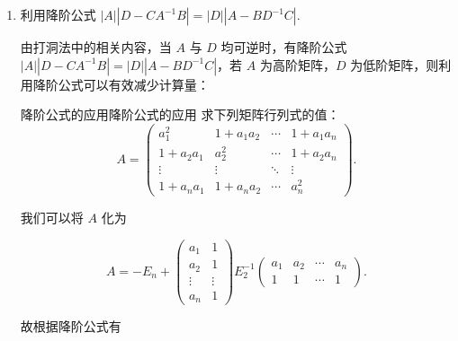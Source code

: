 \begin{enumerate}
    \item 利用降阶公式 $|A||D - CA^{-1}B| = |D||A - BD^{-1}C|$.

        由打洞法中的相关内容，当 $A$ 与 $D$ 均可逆时，有降阶公式 $|A||D - CA^{-1}B| = |D||A - BD^{-1}C|$，若 $A$ 为高阶矩阵，$D$ 为低阶矩阵，则利用降阶公式可以有效减少计算量：

        \begin{example}{降阶公式的应用}{降阶公式的应用}
            求下列矩阵行列式的值：
            \[A=\begin{pmatrix}
                    a_1^2    & 1+a_1a_2   & \cdots & 1+a_1a_n \\
                    1+a_2a_1 & a_2^2    & \cdots & 1+a_2a_n \\
                    \vdots   & \vdots   & \ddots & \vdots   \\
                    1+a_na_1 & 1+a_na_2 & \cdots & a_n^2
                \end{pmatrix}.\]
        \end{example}

        \begin{solution}
            我们可以将 $A$ 化为

            \[ A = -E_n + \begin{pmatrix}
                    a_1 & 1 \\ a_2 & 1 \\ \vdots & \vdots \\ a_n & 1
                \end{pmatrix} E_2^{-1} \begin{pmatrix}
                    a_1 & a_2 & \cdots & a_n \\ 1 & 1 & \cdots & 1
                \end{pmatrix}. \]

            故根据降阶公式有


\end{solution}
\end{enumerate}
